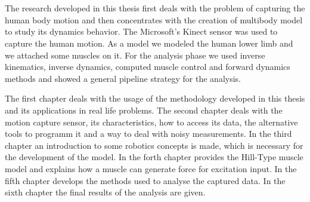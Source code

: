 \section*{\texorpdfstring{}{}}

\en
The research developed in this thesis first deals with the problem of capturing the human body motion and then concentrates with the creation of multibody model to study its dynamics behavior. The Microsoft's Kinect sensor was used to capture the human motion. As a model we modeled the human lower limb and we attached some muscles on it. For the analysis phase we used inverse kinematics, inverse dynamics, computed muscle control and forward dynamics methods and showed a general pipeline strategy for the analysis.

The first chapter deals with the usage of the methodology developed in this thesis and its applications in real life problems. The second chapter deals with the motion capture sensor, its characteristics, how to access its data, the alternative tools to programm it and a way to deal with noisy measurements. In the third chapter an introduction to some robotics concepts is made, which is necessary for the development of the model. In the forth chapter provides the Hill-Type muscle model and explains how a muscle can generate force for excitation input. In the fifth chapter develops the methods used to analyse the captured data. In the sixth chapter the final results of the analysis are given.
\gr


\paragraph{\textbf{}}

\thispagestyle{empty}
\clearpage\mbox{}
\thispagestyle{empty}